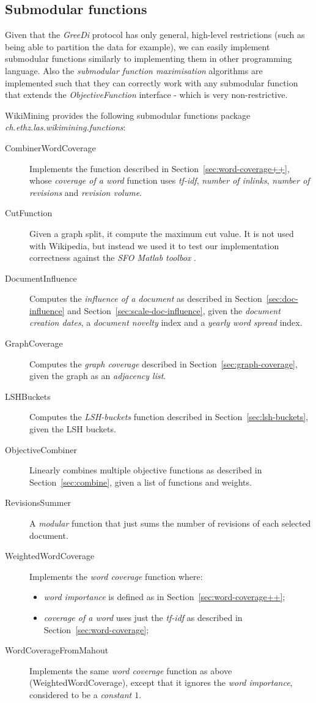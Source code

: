 \subsection{Submodular functions}

Given that the \emph{GreeDi} protocol has only general, high-level restrictions
(such as being able to partition the data for example), we can easily implement
submodular functions similarly to implementing them in other programming
language. Also the \emph{submodular function maximisation} algorithms are
implemented such that they can correctly work with any submodular function that
extends the \emph{ObjectiveFunction} interface - which is very non-restrictive.

WikiMining provides the following submodular functions package
\emph{ch.ethz.las.wikimining.functions}:
\begin{description}
  \item[CombinerWordCoverage] Implements the function described in
  Section~\vref{sec:word-coverage++}, whose \emph{coverage of a word} function
  uses \emph{tf-idf}, \emph{number of inlinks}, \emph{number of revisions} and
  \emph{revision volume}.
  \item[CutFunction] Given a graph split, it compute the maximum cut value. It
  is not used with Wikipedia, but instead we used it to test our implementation
  correctness against the \emph{SFO Matlab toolbox} \cite{krause2010sfo}.
  \item[DocumentInfluence] Computes the \emph{influence of a document} as
  described in Section~\vref{sec:doc-influence} and
  Section~\vref{sec:scale-doc-influence}, given the \emph{document creation
  dates}, a \emph{document novelty} index and a \emph{yearly word spread}
  index.
  \item[GraphCoverage] Computes the \emph{graph coverage} described in
  Section~\vref{sec:graph-coverage}, given the graph as an \emph{adjacency
  list}.
  \item[LSHBuckets] Computes the \emph{\ac{LSH}-buckets} function described in
  Section~\vref{sec:lsh-buckets}, given the \ac{LSH} buckets.
  \item[ObjectiveCombiner] Linearly combines multiple objective functions as
  described in Section~\vref{sec:combine}, given a list of
  functions and weights.
  \item[RevisionsSummer] A \emph{modular} function that just sums the number of
  revisions of each selected document.
  \item[WeightedWordCoverage] Implements the \emph{word coverage} function
  where:
    \begin{itemize}
      \item \emph{word importance} is defined as in
      Section~\vref{sec:word-coverage++};
      \item \emph{coverage of a word} uses just the \emph{tf-idf} as described
      in Section~\vref{sec:word-coverage};
    \end{itemize}
  \item[WordCoverageFromMahout] Implements the same \emph{word coverage}
  function as above (WeightedWordCoverage), except that it ignores the
  \emph{word importance}, considered to be a \emph{constant \(1\)}.
\end{description}
